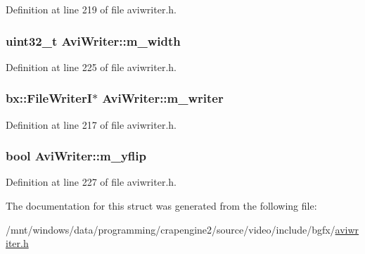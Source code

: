 Definition at line 219 of file aviwriter.\+h.

\hypertarget{struct_avi_writer_adb23fafeaef53fa6ccee67cd9e8223d3}{
\subsubsection[{m\+\_\+width}]{\setlength{\rightskip}{0pt plus 5cm}uint32\+\_\+t Avi\+Writer\+::m\+\_\+width}}\label{struct_avi_writer_adb23fafeaef53fa6ccee67cd9e8223d3}


Definition at line 225 of file aviwriter.\+h.

\hypertarget{struct_avi_writer_a894a53726105f6456bffc9cc872d3d34}{
\subsubsection[{m\+\_\+writer}]{\setlength{\rightskip}{0pt plus 5cm}bx\+::\+File\+Writer\+I$\ast$ Avi\+Writer\+::m\+\_\+writer}}\label{struct_avi_writer_a894a53726105f6456bffc9cc872d3d34}


Definition at line 217 of file aviwriter.\+h.

\hypertarget{struct_avi_writer_a66f15305cd2704f8c6254a53797a11b0}{
\subsubsection[{m\+\_\+yflip}]{\setlength{\rightskip}{0pt plus 5cm}bool Avi\+Writer\+::m\+\_\+yflip}}\label{struct_avi_writer_a66f15305cd2704f8c6254a53797a11b0}


Definition at line 227 of file aviwriter.\+h.



The documentation for this struct was generated from the following file\+:\begin{DoxyCompactItemize}
\item 
/mnt/windows/data/programming/crapengine2/source/video/include/bgfx/\hyperlink{aviwriter_8h}{aviwriter.\+h}\end{DoxyCompactItemize}
